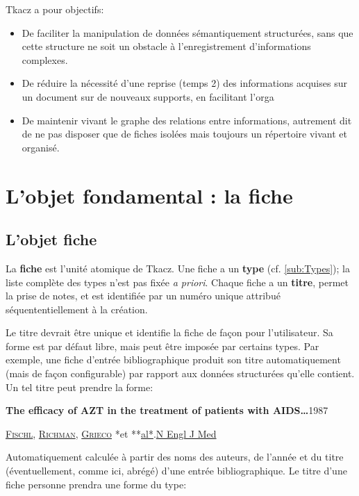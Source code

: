 \documentclass[11pt]{article}
\newcommand\tzcard[1]{%
    \begin{minipage}[t]{1\columnwidth}%
    \begin{shaded}%
    \sffamily #1
    \end{shaded}%
    \end{minipage}
}
\begin{document}
Tkacz a pour objectifs:

\begin{itemize}
\itemsep1pt\parskip0pt
\item
  De faciliter la manipulation de données sémantiquement structurées,
  sans que cette structure ne soit un obstacle à l'enregistrement
  d'informations complexes.
\item
  De réduire la nécessité d'une reprise (temps 2) des informations
  acquises sur un document sur de nouveaux supports, en facilitant
  l'orga
\item
  De maintenir vivant le graphe des relations entre informations,
  autrement dit de ne pas disposer que de fiches isolées mais toujours
  un \og répertoire \fg{} vivant et organisé.
\end{itemize}

\section{L'objet fondamental : la
fiche}\label{lobjet-fondamental-la-fiche}

\subsection{L'objet fiche}\label{lobjet-fiche}

La \textbf{fiche} est l'unité atomique de Tkacz. Une fiche a un
\textbf{type} (cf. \vref{sub:Types}); la liste complète des types n'est
pas fixée \emph{a priori}. Chaque fiche a un \textbf{titre}, permet la
prise de notes, et est identifiée par un numéro unique attribué
séquententiellement à la création.

Le titre devrait être unique et identifie la fiche de façon pour
l'utilisateur. Sa forme est par défaut libre, mais peut être imposée par
certains types. Par exemple, une fiche d'entrée bibliographique produit
son titre automatiquement (mais de façon configurable) par rapport aux
données structurées qu'elle contient. Un tel titre peut prendre la
forme:

\tzcard{\textbf{The efficacy of AZT in the treatment of patients
with AIDS…}\hfill1987

\textsc{\uline{Fischl}}, \textsc{\uline{Richman}}, \textsc{\uline{Grieco}} *et **\uline{al*}.\hfill \uline{N
Engl J Med}}

Automatiquement calculée à partir des noms des auteurs, de l'année et du
titre (éventuellement, comme ici, abrégé) d'une entrée bibliographique.
Le titre d'une fiche personne prendra une forme du type:
\end{document}
